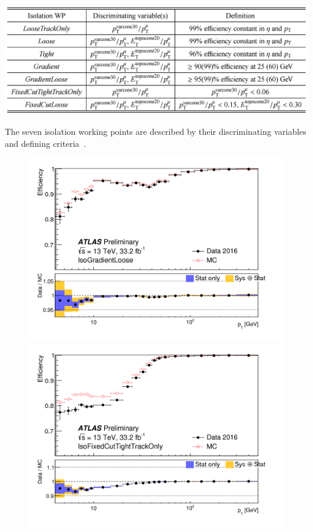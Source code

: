 \begin{table}[!h]
	\centering 
    \includegraphics[width=.9\textwidth]{Pictures/isolationworkingpoints.PNG}
    \caption{The seven isolation working points are described by their discriminating variables and defining criteria~\cite{MCPpaper}.}
    \label{tab:datasetsdef}
\end{table}

\begin{figure}[!h]
  \centering
  \begin{minipage}[b]{0.47\textwidth}
    \includegraphics[width=\textwidth]{Pictures/isolationefficiency1.png}
  \end{minipage}
  \hspace{.2cm}
  \begin{minipage}[b]{0.48\textwidth}
    \includegraphics[width=\textwidth]{Pictures/isolationefficiency2.png}

\end{minipage}
\end{figure}
